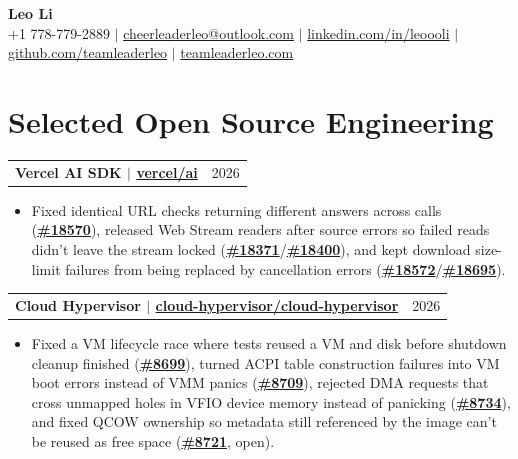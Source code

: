 \documentclass[letterpaper,11pt]{article}
\makeatletter
\newcommand{\resumeHeadingSimple}[2]{%
  \begin{tabularx}{\textwidth}{@{}Xr@{}}
    \textbf{#1} & #2
  \end{tabularx}\vspace{-1pt}
}
\newcommand{\resumeItemListStart}{\begin{itemize}[leftmargin=0.23in,itemsep=0.4pt,parsep=0pt,topsep=0.5pt]}
\newcommand{\resumeItem}[1]{\item\fontsize{9.9pt}{11.1pt}\selectfont #1}
\newcommand{\resumeItemListEnd}{\end{itemize}\vspace{-1.25pt}}
\makeatother
\begin{document}
\begin{center}
  {\Huge\textbf{Leo Li}} \\[2pt]
  \small
  +1 778-779-2889 $|$
  \href{mailto:cheerleaderleo@outlook.com}{cheerleaderleo@outlook.com} $|$
  \href{https://www.linkedin.com/in/leoooli/}{linkedin.com/in/leoooli} $|$
  \href{https://github.com/teamleaderleo}{github.com/teamleaderleo} $|$
  \href{https://teamleaderleo.com/}{teamleaderleo.com}
\end{center}
\vspace{-10pt}

\section{Selected Open Source Engineering}

\resumeHeadingSimple
  {Vercel AI SDK $|$ \href{https://redirect.github.com/vercel/ai}{vercel/ai}}
  {2026}
\resumeItemListStart
  \resumeItem{Fixed identical URL checks returning different answers across calls (\href{https://redirect.github.com/vercel/ai/pull/18570}{\textbf{\#18570}}), released Web Stream readers after source errors so failed reads didn't leave the stream locked (\href{https://redirect.github.com/vercel/ai/pull/18371}{\textbf{\#18371}}/\href{https://redirect.github.com/vercel/ai/pull/18400}{\textbf{\#18400}}), and kept download size-limit failures from being replaced by cancellation errors (\href{https://redirect.github.com/vercel/ai/pull/18572}{\textbf{\#18572}}/\href{https://redirect.github.com/vercel/ai/pull/18695}{\textbf{\#18695}}).}
\resumeItemListEnd

\resumeHeadingSimple
  {Cloud Hypervisor $|$ \href{https://redirect.github.com/cloud-hypervisor/cloud-hypervisor}{cloud-hypervisor/cloud-hypervisor}}
  {2026}
\resumeItemListStart
  \resumeItem{Fixed a VM lifecycle race where tests reused a VM and disk before shutdown cleanup finished (\href{https://redirect.github.com/cloud-hypervisor/cloud-hypervisor/pull/8699}{\textbf{\#8699}}), turned ACPI table construction failures into VM boot errors instead of VMM panics (\href{https://redirect.github.com/cloud-hypervisor/cloud-hypervisor/pull/8709}{\textbf{\#8709}}), rejected DMA requests that cross unmapped holes in VFIO device memory instead of panicking (\href{https://redirect.github.com/cloud-hypervisor/cloud-hypervisor/pull/8734}{\textbf{\#8734}}), and fixed QCOW ownership so metadata still referenced by the image can't be reused as free space (\href{https://redirect.github.com/cloud-hypervisor/cloud-hypervisor/pull/8721}{\textbf{\#8721}}, open).}
\resumeItemListEnd
\end{document}
